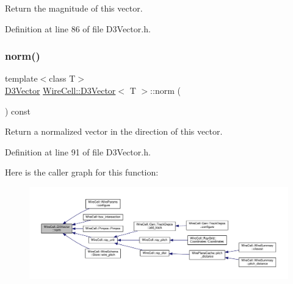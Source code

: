 Return the magnitude of this vector. 



Definition at line 86 of file D3\+Vector.\+h.

\mbox{\label{class_wire_cell_1_1_d3_vector_a9cff9bf6015c3f7742d4fae7aac7c4a5}} 
\subsubsection{\texorpdfstring{norm()}{norm()}}
{\footnotesize\ttfamily template$<$class T$>$ \\
\hyperlink{class_wire_cell_1_1_d3_vector}{D3\+Vector} \hyperlink{class_wire_cell_1_1_d3_vector}{Wire\+Cell\+::\+D3\+Vector}$<$ T $>$\+::norm (\begin{DoxyParamCaption}{ }\end{DoxyParamCaption}) const\hspace{0.3cm}{\ttfamily [inline]}}



Return a normalized vector in the direction of this vector. 



Definition at line 91 of file D3\+Vector.\+h.

Here is the caller graph for this function\+:
\nopagebreak
\begin{figure}[H]
\begin{center}
\leavevmode
\includegraphics[width=350pt]{class_wire_cell_1_1_d3_vector_a9cff9bf6015c3f7742d4fae7aac7c4a5_icgraph}
\end{center}
\end{figure}
\mbox{\label{class_wire_cell_1_1_d3_vector_ac7393e217cc1d10e385b27fd40e70e0b}} 
